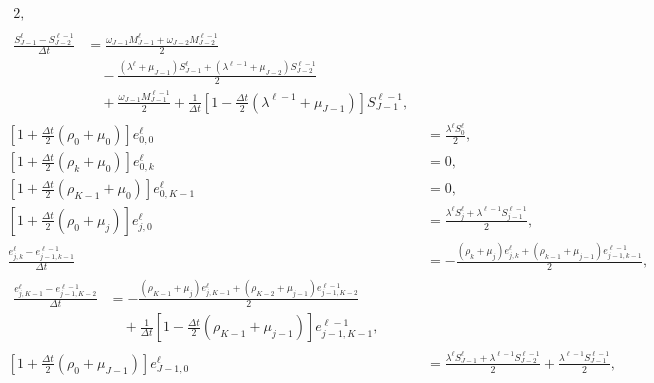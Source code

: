 \documentclass[USenglish]{article}
\begin{document}
\begin{subequations}
\begin{align}
\begin{split}
      {2},
    \end{split}
    \\
    \begin{split}
      \frac{S_{J - 1}^{\ell} - S_{J - 2}^{\ell - 1}}{\Delta t}
      &=
      \frac{\omega_{J - 1} M_{J - 1}^{\ell}
        + \omega_{J - 2} M_{J - 2}^{\ell - 1}}
      {2}
      \\ & \quad {}
      - \frac{(\lambda^{\ell} + \mu_{J - 1}) S_{J - 1}^{\ell}
        + (\lambda^{\ell - 1} + \mu_{J - 2}) S_{J - 2}^{\ell - 1}}
      {2}
      \\ & \quad {}
      + \frac{\omega_{J - 1} M_{J - 1}^{\ell - 1}}{2}
      + \frac{1}{\Delta t} \left[
        1 - \frac{\Delta t}{2} (\lambda^{\ell - 1} + \mu_{J - 1})
      \right] S_{J - 1}^{\ell - 1},
    \end{split}
    \\
    \left[1 + \frac{\Delta t}{2} (\rho_0 + \mu_0)\right] e_{0, 0}^{\ell}
    &=
    \frac{\lambda^{\ell} S_0^{\ell}}{2},
    \\
    \left[1 + \frac{\Delta t}{2} (\rho_k + \mu_0)\right] e_{0, k}^{\ell}
    &= 0,
    \\
    \left[1 + \frac{\Delta t}{2} (\rho_{K - 1} + \mu_0)\right] e_{0, K - 1}^{\ell}
    &= 0,
    \\
    \left[1 + \frac{\Delta t}{2} (\rho_0 + \mu_j)\right] e_{j, 0}^{\ell}
    &=
    \frac{\lambda^{\ell} S_j^{\ell}
      + \lambda^{\ell - 1} S_{j - 1}^{\ell - 1}}
    {2},
    \\
    \frac{e_{j, k}^{\ell} - e_{j - 1, k - 1}^{\ell - 1}}{\Delta t}
    &= - \frac{(\rho_k + \mu_j) e_{j, k}^{\ell}
      + (\rho_{k - 1} + \mu_{j - 1}) e_{j - 1, k - 1}^{\ell - 1}}
    {2},
    \\
    \begin{split}
      \frac{e_{j, K - 1}^{\ell} - e_{j - 1, K - 2}^{\ell - 1}}{\Delta t}
      &= - \frac{(\rho_{K - 1} + \mu_j) e_{j, K - 1}^{\ell}
        + (\rho_{K - 2} + \mu_{j - 1}) e_{j - 1, K - 2}^{\ell - 1}}
      {2}
      \\ & \quad {}
      + \frac{1}{\Delta t} \left[
        1 - \frac{\Delta t}{2} (\rho_{K - 1} + \mu_{j - 1})
      \right] e_{j - 1, K - 1}^{\ell - 1},
    \end{split}
    \\
    \left[1 + \frac{\Delta t}{2} (\rho_0 + \mu_{J - 1})\right] e_{J - 1, 0}^{\ell}
    &=
    \frac{\lambda^{\ell} S_{J - 1}^{\ell}
      + \lambda^{\ell - 1} S_{J - 2}^{\ell - 1}}
    {2}
    + \frac{\lambda^{\ell - 1} S_{J - 1}^{\ell - 1}}{2},

\end{align}
\end{subequations}
\end{document}
